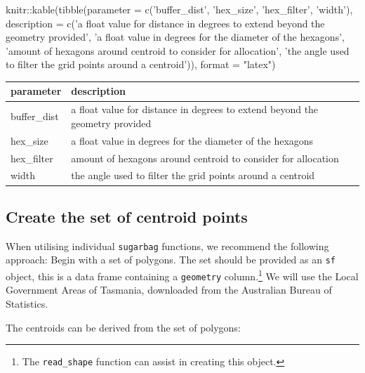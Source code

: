 \begin{Schunk}
\begin{Sinput}
knitr::kable(tibble(parameter = c('buffer_dist', 'hex_size',  'hex_filter', 'width'),
  description = c('a float value for distance in degrees to extend beyond the geometry provided',
    'a float value in degrees for the diameter of the hexagons', 'amount of hexagons around centroid to consider for allocation',
    'the angle used to filter the grid points around a centroid')), format = "latex")
\end{Sinput}

\begin{tabular}{l|l}
\hline
parameter & description\\
\hline
buffer\_dist & a float value for distance in degrees to extend beyond the geometry provided\\
\hline
hex\_size & a float value in degrees for the diameter of the hexagons\\
\hline
hex\_filter & amount of hexagons around centroid to consider for allocation\\
\hline
width & the angle used to filter the grid points around a centroid\\
\hline
\end{tabular}

\end{Schunk}

\hypertarget{create-the-set-of-centroid-points}{%
\subsection{Create the set of centroid
points}\label{create-the-set-of-centroid-points}}

When utilising individual \texttt{sugarbag} functions, we recommend the
following approach: Begin with a set of polygons. The set should be
provided as an \texttt{sf} object, this is a data frame containing a
\texttt{geometry} column.\footnote{The \texttt{read\_shape} function can
  assist in creating this object.} We will use the Local Government
Areas of Tasmania, downloaded from the Australian Bureau of Statistics.

The centroids can be derived from the set of polygons:

